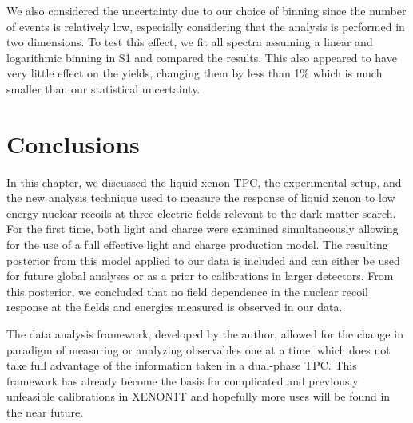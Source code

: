  We also considered the uncertainty due to our choice of binning since the number of events is relatively low, especially considering that the analysis is performed in two dimensions.  To test this effect, we fit all spectra assuming a linear and logarithmic binning in S1 and compared the results.  This also appeared to have very little effect on the yields, changing them by less than 1\% which is much smaller than our statistical uncertainty.  



\section{Conclusions}


In this chapter, we discussed the liquid xenon TPC, the experimental setup, and the new analysis technique used to measure the response of liquid xenon to low energy nuclear recoils at three electric fields relevant to the dark matter search.  For the first time, both light and charge were examined simultaneously allowing for the use of a full effective light and charge production model.  The resulting posterior from this model applied to our data is included and can either be used for future global analyses or as a prior to calibrations in larger detectors.  From this posterior, we concluded that no field dependence in the nuclear recoil response at the fields and energies measured is observed in our data.

The data analysis framework, developed by the author, allowed for the change in paradigm of measuring or analyzing observables one at a time, which does not take full advantage of the information taken in a dual-phase TPC.  This framework has already become the basis for complicated and previously unfeasible calibrations in XENON1T and hopefully more uses will be found in the near future.





